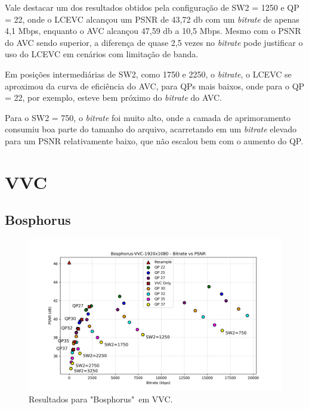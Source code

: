 Vale destacar um dos resultados obtidos pela configuração de SW2 = 1250 e QP = 22, onde
o \acrshort{LCEVC} alcançou um \acrshort{PSNR} de 43,72 db com um \textit{bitrate} 
de apenas 4,1 Mbps, enquanto o \acrshort{AVC} alcançou 47,59 db a 10,5 Mbps. Mesmo
com o \acrshort{PSNR} do \acrshort{AVC} sendo superior, a diferença de quase 2,5 vezes
no \textit{bitrate} pode justificar o uso do \acrshort{LCEVC} em cenários com limitação
de banda.

Em posições intermediárias de SW2, como 1750 e 2250, o \textit{bitrate}, o \acrshort{LCEVC}
se aproximou da curva de eficiência do \acrshort{AVC}, para QPs mais baixos, onde para o QP = 22,
por exemplo, esteve bem próximo do \textit{bitrate} do \acrshort{AVC}.

Para o SW2 = 750, o \textit{bitrate} foi muito alto, onde a camada de aprimoramento
consumiu boa parte do tamanho do arquivo, acarretando em um \textit{bitrate} elevado para um
\acrshort{PSNR} relativamente baixo, que não escalou bem com o aumento do QP.

\newpage

\section{VVC}

\subsection{Bosphorus}

\begin{figure}[h]
    \centering
    \includegraphics[width=1.0\textwidth]{img/Bosphorus-VVC.png}
    \caption{Resultados para "Bosphorus"\ em \acrshort{VVC}. \cite{uvg_dataset}}
    \label{fig:Bosphorus-VVC}
\end{figure}

